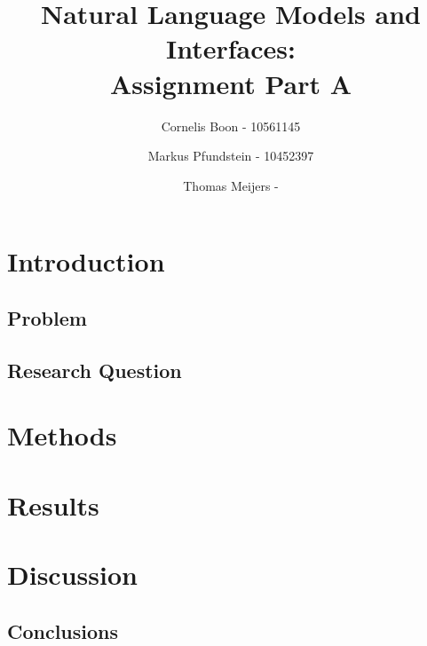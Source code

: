 \documentclass[final,12pt]{elsarticle}
\begin{document}
\begin{frontmatter}
\title{Natural Language Models and Interfaces: \\ Assignment Part A}
\author{Cornelis Boon - 10561145} 
\author{Markus Pfundstein - 10452397}
\author{Thomas Meijers - %
}
\begin{abstract}
\end{abstract}
\end{frontmatter}
\newpage

\section{Introduction}
\subsection{Problem}
\subsection{Research Question}
\section{Methods}
\section{Results}
\section{Discussion}
\subsection{Conclusions}
\end{document}
